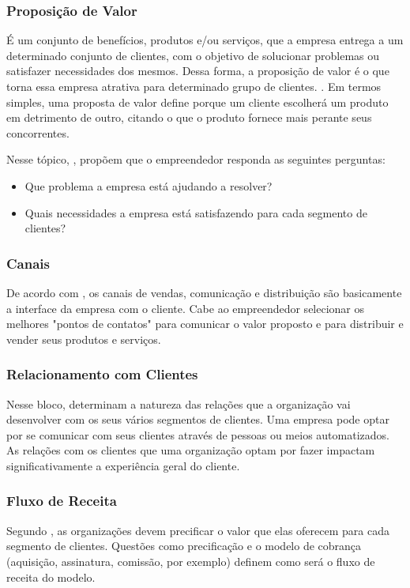 \subsubsection{Proposição de Valor}
\label{cha:proposicao_de_valor}
É um conjunto de benefícios, produtos e/ou serviços, que a empresa entrega a um determinado conjunto de clientes, com o objetivo de solucionar problemas ou satisfazer necessidades dos
mesmos. Dessa forma, a proposição de valor é o que torna essa empresa atrativa para
determinado grupo de clientes. \cite{businessmodel}. Em termos simples, uma proposta de valor define porque um cliente escolherá um produto em detrimento de outro, citando o que o produto fornece mais perante seus concorrentes.

Nesse tópico, , propõem que o empreendedor responda as seguintes perguntas:
\begin{itemize}
\item Que problema a empresa está ajudando a resolver?
\item Quais necessidades a empresa está satisfazendo para cada segmento de clientes?
\end{itemize}

\subsubsection{Canais}
\label{cha:canais}
De acordo com , os canais de vendas, comunicação e distribuição são basicamente a interface da empresa com o cliente. Cabe ao empreendedor selecionar os melhores "pontos de contatos" para comunicar o valor proposto e para distribuir e vender seus produtos e serviços.

\subsubsection{Relacionamento com Clientes}
\label{cha:relacionamentos_com_clientes}
Nesse bloco,  determinam a natureza das relações que a organização vai desenvolver com os seus vários segmentos de clientes. Uma empresa pode optar por se comunicar com seus clientes através de pessoas ou meios automatizados. As relações com os clientes que uma organização optam por fazer impactam significativamente a experiência geral do cliente.

\subsubsection{Fluxo de Receita}
\label{cha:fluxo_de_receita}
Segundo , as organizações devem precificar o valor que elas oferecem para cada segmento de clientes. Questões como precificação e o modelo de cobrança (aquisição, assinatura, comissão, por exemplo) definem como será o fluxo de receita do modelo.

